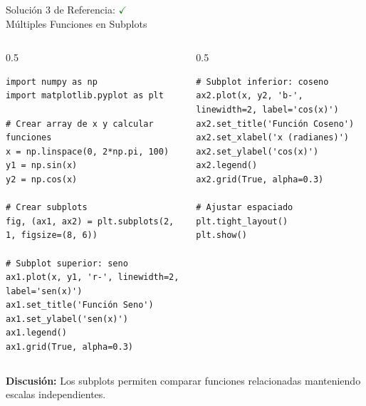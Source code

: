 \documentclass[10pt]{beamer}
\begin{document}
\begin{frame}[fragile]{Solución 3 de Referencia: \hfill \textcolor{green}{$\checkmark$} \\ Múltiples Funciones en Subplots}
\begin{columns}
\begin{column}{0.5\textwidth}
\begin{verbatim}
import numpy as np
import matplotlib.pyplot as plt

# Crear array de x y calcular funciones
x = np.linspace(0, 2*np.pi, 100)
y1 = np.sin(x)
y2 = np.cos(x)

# Crear subplots
fig, (ax1, ax2) = plt.subplots(2, 1, figsize=(8, 6))

# Subplot superior: seno
ax1.plot(x, y1, 'r-', linewidth=2, label='sen(x)')
ax1.set_title('Función Seno')
ax1.set_ylabel('sen(x)')
ax1.legend()
ax1.grid(True, alpha=0.3)
\end{verbatim}
\end{column}
\begin{column}{0.5\textwidth}
\begin{verbatim}
# Subplot inferior: coseno
ax2.plot(x, y2, 'b-', linewidth=2, label='cos(x)')
ax2.set_title('Función Coseno')
ax2.set_xlabel('x (radianes)')
ax2.set_ylabel('cos(x)')
ax2.legend()
ax2.grid(True, alpha=0.3)

# Ajustar espaciado
plt.tight_layout()
plt.show()
\end{verbatim}
\end{column}
\end{columns}
\vspace{0.3cm}
\textbf{Discusión:} Los subplots permiten comparar funciones relacionadas manteniendo escalas independientes.
\end{frame}
\end{document}
